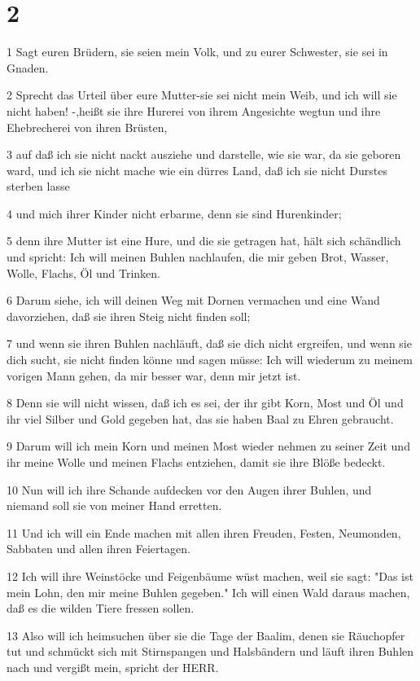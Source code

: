 \chapter{2}

\par 1 Sagt euren Brüdern, sie seien mein Volk, und zu eurer Schwester, sie sei in Gnaden.
\par 2 Sprecht das Urteil über eure Mutter-sie sei nicht mein Weib, und ich will sie nicht haben! -,heißt sie ihre Hurerei von ihrem Angesichte wegtun und ihre Ehebrecherei von ihren Brüsten,
\par 3 auf daß ich sie nicht nackt ausziehe und darstelle, wie sie war, da sie geboren ward, und ich sie nicht mache wie ein dürres Land, daß ich sie nicht Durstes sterben lasse
\par 4 und mich ihrer Kinder nicht erbarme, denn sie sind Hurenkinder;
\par 5 denn ihre Mutter ist eine Hure, und die sie getragen hat, hält sich schändlich und spricht: Ich will meinen Buhlen nachlaufen, die mir geben Brot, Wasser, Wolle, Flachs, Öl und Trinken.
\par 6 Darum siehe, ich will deinen Weg mit Dornen vermachen und eine Wand davorziehen, daß sie ihren Steig nicht finden soll;
\par 7 und wenn sie ihren Buhlen nachläuft, daß sie dich nicht ergreifen, und wenn sie dich sucht, sie nicht finden könne und sagen müsse: Ich will wiederum zu meinem vorigen Mann gehen, da mir besser war, denn mir jetzt ist.
\par 8 Denn sie will nicht wissen, daß ich es sei, der ihr gibt Korn, Most und Öl und ihr viel Silber und Gold gegeben hat, das sie haben Baal zu Ehren gebraucht.
\par 9 Darum will ich mein Korn und meinen Most wieder nehmen zu seiner Zeit und ihr meine Wolle und meinen Flachs entziehen, damit sie ihre Blöße bedeckt.
\par 10 Nun will ich ihre Schande aufdecken vor den Augen ihrer Buhlen, und niemand soll sie von meiner Hand erretten.
\par 11 Und ich will ein Ende machen mit allen ihren Freuden, Festen, Neumonden, Sabbaten und allen ihren Feiertagen.
\par 12 Ich will ihre Weinstöcke und Feigenbäume wüst machen, weil sie sagt: "Das ist mein Lohn, den mir meine Buhlen gegeben." Ich will einen Wald daraus machen, daß es die wilden Tiere fressen sollen.
\par 13 Also will ich heimsuchen über sie die Tage der Baalim, denen sie Räuchopfer tut und schmückt sich mit Stirnspangen und Halsbändern und läuft ihren Buhlen nach und vergißt mein, spricht der HERR.
